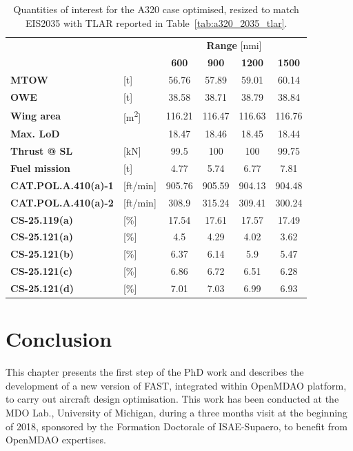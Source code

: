 \begin{table}[!h]
	\centering
	\begin{tabular}{l l c c c c}
		\cline{3-6}
		& & \multicolumn{4}{c}{\textbf{Range} [nmi]} \\
		& & \textbf{600} & \textbf{900} & \textbf{1200} & \textbf{1500} \\
		\hline
		\textbf{MTOW} & [\si{\tonne}] & 56.76 & 57.89 & 59.01 & 60.14 \\
		\textbf{OWE} & [\si{\tonne}] & 38.58 & 38.71 & 38.79 & 38.84  \\
		\textbf{Wing area} & [\si{\square\meter}] & 116.21 & 116.47 & 116.63 & 116.76 \\
		\textbf{Max. LoD} & & 18.47 & 18.46 & 18.45 & 18.44 \\
		\textbf{Thrust @ SL} & [\si{\kilo\newton}] & 99.5 & 100 & 100 & 99.75 \\
		\textbf{Fuel mission} & [\si{\tonne}] & 4.77 & 5.74 & 6.77 & 7.81 \\
		\hline
		\textbf{CAT.POL.A.410(a)-1} & [ft/min] & 905.76 & 905.59 & 904.13 & 904.48 \\
		\textbf{CAT.POL.A.410(a)-2} & [ft/min] & 308.9 & 315.24 & 309.41 & 300.24 \\
		\textbf{CS-25.119(a)} & [\%] & 17.54 & 17.61 & 17.57 & 17.49 \\
		\textbf{CS-25.121(a)} & [\%] & 4.5 & 4.29 & 4.02 & 3.62 \\
		\textbf{CS-25.121(b)} & [\%] & 6.37 & 6.14 & 5.9 & 5.47 \\
		\textbf{CS-25.121(c)} & [\%] & 6.86 & 6.72 & 6.51 & 6.28 \\
		\textbf{CS-25.121(d)} & [\%] & 7.01 & 7.03 & 6.99 & 6.93 \\
		\hline
	\end{tabular}
	\caption{Quantities of interest for the A320 case optimised, resized to match EIS2035 with TLAR reported in Table~\ref{tab:a320_2035_tlar}.}
	\label{tab:a320_2035_optim_res}
\end{table}

\section{Conclusion}
\label{sec:chap2_fast_omdao_base_conclusion}

This chapter presents the first step of the PhD work and describes the development of a new version of FAST, integrated within OpenMDAO platform, to carry out aircraft design optimisation. 
This work has been conducted at the MDO Lab., University of Michigan, during a three months visit at the beginning of 2018, sponsored by the Formation Doctorale of ISAE-Supaero, to benefit from OpenMDAO expertises. 

